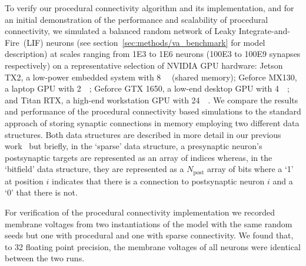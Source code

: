 \documentclass[9pt,a4paper]{amsart}
\begin{document}
To verify our procedural connectivity algorithm and its implementation, and for an initial demonstration of the performance and scalability of procedural connectivity, we simulated a balanced random network of Leaky Integrate-and-Fire~(LIF) neurons (see section~\ref{sec:methods/va_benchmark} for model description) at scales ranging from \num{1E3} to \num{1E6} neurons (\num{100E3} to \num{100E9} synapses respectively) on a representative selection of NVIDIA GPU hardware:
Jetson TX2, a low-power embedded system with \SI{8}{\giga\byte} (shared memory);
Geforce MX130, a laptop GPU with \SI{2}{\giga\byte};
Geforce GTX 1650, a low-end desktop GPU with \SI{4}{\giga\byte};
and Titan RTX, a high-end workstation GPU with \SI{24}{\giga\byte}.
We compare the results and performance of the procedural connectivity based simulations to the standard approach of storing synaptic connections in memory employing two different data structures.
Both data structures are described in more detail in our previous work~\citep{Knight2018} but briefly, in the `sparse' data structure, a presynaptic neuron's postsynaptic targets are represented as an array of indices whereas, in the `bitfield' data structure, they are represented as a $N_{\text{post}}$ array of bits where a `1' at position $i$ indicates that there is a connection to postsynaptic neuron $i$ and a `0' that there is not.

For verification of the procedural connectivity implementation we recorded membrane voltages from two instantiations of the model with the same random seeds but one with procedural and one with sparse connectivity.
We found that, to \SI{32}{\bit} floating point precision, the membrane voltages of all neurons were identical between the two runs.
\end{document}
